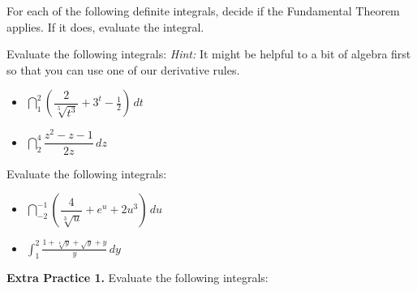 \documentclass[10pt]{article}
\begin{document}
\vspace{3cm}



\exercise{}   For each of the following definite integrals, decide if the Fundamental Theorem applies.  If it does, evaluate the integral.\\




  \example Evaluate the following integrals: {\em Hint:} It might be helpful to a bit of algebra first so that you can use one of our derivative rules.

\begin{itemize}

\item[(a)] $\dint_1^2 \left( \dfrac{2}{\sqrt[5]{t^3}} + 3^t - \frac12 \right)\,dt$
    
    \vfill

\item[(b)] $\dint_2^4 \dfrac{z^2-z-1}{2z}\,dz$

    \vfill

\end{itemize}
\newpage
\exercise {}  Evaluate the following integrals:

\begin{itemize}

\item[(a)] $\dint_{-2}^{-1} \left( \dfrac{4}{\sqrt[3]{u}} + e^u + 2u^3 \right) \, du$


\item[(b)] $\displaystyle\int_{1}^2 \frac{1+\sqrt[4]{y}+\sqrt{y}+y}{y} \, dy$


\end{itemize}



{\bf\color{blue}Extra Practice 1.} Evaluate the following integrals:
\end{document}
